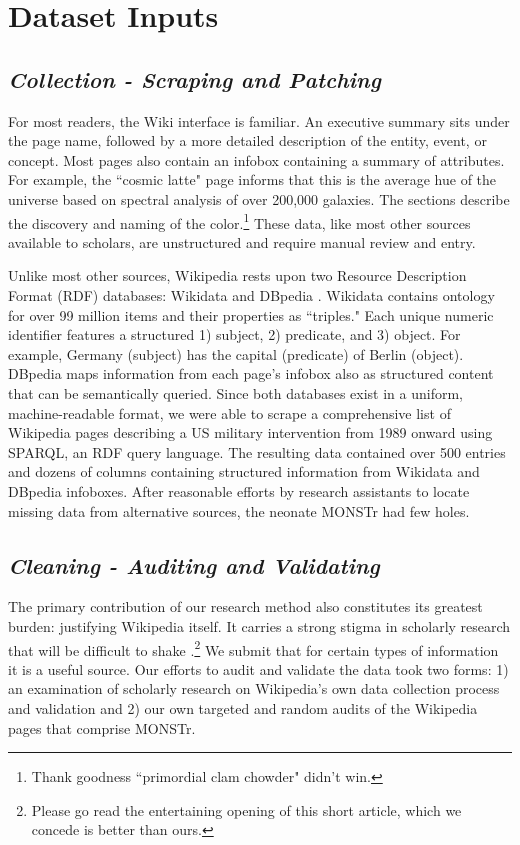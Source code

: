 \documentclass[fleqn,12pt]{article}
\begin{document}
\section*{Dataset Inputs}
\subsection*{\textit{Collection - Scraping and Patching}}
For most readers, the Wiki interface is familiar. An executive summary sits under the page name, followed by a more detailed description of the entity, event, or concept. Most pages also contain an infobox containing a summary of attributes. For example, the ``cosmic latte" page informs that this is the average hue of the universe based on spectral analysis of over 200,000 galaxies. The sections describe the discovery and naming of the color.\footnote{Thank goodness ``primordial clam chowder" didn't win.} These data, like most other sources available to scholars, are unstructured and require manual review and entry.

Unlike most other sources, Wikipedia rests upon two Resource Description Format (RDF) databases: Wikidata and DBpedia \citep{Malyshev18}. Wikidata contains ontology for over 99 million items and their properties as ``triples." Each unique numeric identifier features a structured 1) subject, 2) predicate, and 3) object. For example, Germany (subject) has the capital (predicate) of Berlin (object). DBpedia maps information from each page's infobox also as structured content that can be semantically queried. Since both databases exist in a uniform, machine-readable format, we were able to scrape a comprehensive list of Wikipedia pages describing a US military intervention from 1989 onward using SPARQL, an RDF query language. The resulting data contained over 500 entries and dozens of columns containing structured information from Wikidata and DBpedia infoboxes. After reasonable efforts by research assistants to locate missing data from alternative sources, the neonate MONSTr had few holes.

\subsection*{\textit{Cleaning - Auditing and Validating}}
The primary contribution of our research method also constitutes its greatest burden: justifying Wikipedia itself. It carries a strong stigma in scholarly research that will be difficult to shake \citep{Becker15}.\footnote{Please go read the entertaining opening of this short article, which we concede is better than ours.} We submit that for certain types of information it is a useful source. Our efforts to audit and validate the data took two forms: 1) an examination of scholarly research on Wikipedia's own data collection process and validation and 2) our own targeted and random audits of the Wikipedia pages that comprise MONSTr.
\end{document}
